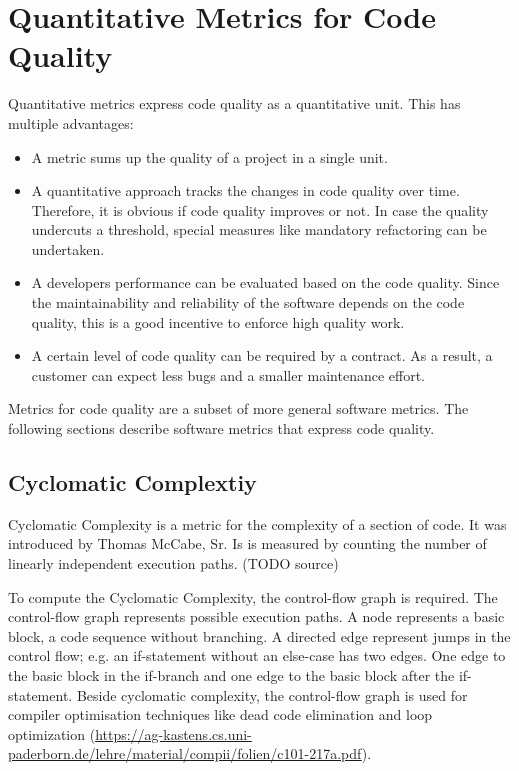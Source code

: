 \section{Quantitative Metrics for Code Quality}
Quantitative metrics  express code quality as a quantitative unit. 
This has multiple advantages:
\begin{itemize}
    \item A metric sums up the quality of a project in a single unit.
    \item A quantitative approach tracks the changes in code quality over time. Therefore, it is obvious if code quality improves or not. In case the quality  undercuts a threshold, special measures like mandatory refactoring can be undertaken.
    \item A developers performance can be evaluated  based on the code quality. Since the maintainability and reliability of the software depends on the code quality, this is a good incentive to enforce high quality work.
    \item A certain level of code quality can be required by a contract. As a result, a customer can expect less bugs and a smaller maintenance effort.
\end{itemize}
Metrics for code quality are a subset of more general software metrics. The following sections describe software metrics that express code quality.

\subsection{Cyclomatic Complextiy}\label{sec:cyclomatic_complexity}
Cyclomatic Complexity is a metric for the complexity of a section of code. It was introduced by Thomas McCabe, Sr.  Is is measured by counting the number of linearly independent execution paths. (TODO source)

To compute  the Cyclomatic Complexity, the control-flow graph is required. The control-flow graph represents possible execution paths. A node represents  a basic block, a code sequence without branching. A directed edge represent jumps in the control flow; e.g. an if-statement without an else-case has two edges. One edge to the basic block in the if-branch  and one edge to the basic block after the if-statement. Beside cyclomatic complexity, the control-flow graph is used for compiler optimisation techniques like dead code elimination and loop optimization (\url{https://ag-kastens.cs.uni-paderborn.de/lehre/material/compii/folien/c101-217a.pdf}).

